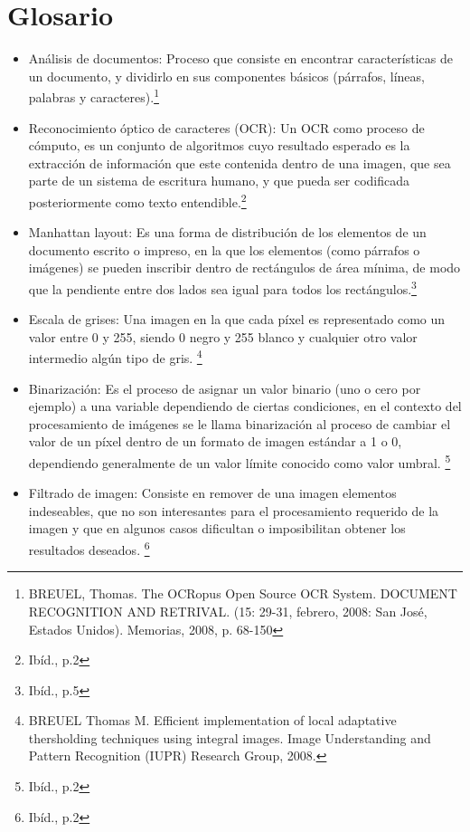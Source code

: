 \documentclass[a4paper, 11pt, oneside]{report}
\begin{document}
\chapter*{Glosario}
\begin{itemize}
    \item Análisis de documentos: Proceso que consiste en encontrar características de un documento,
    y dividirlo en sus componentes básicos (párrafos, líneas, palabras y caracteres).\footnote{BREUEL,
    Thomas. The OCRopus Open Source OCR System. DOCUMENT RECOGNITION AND RETRIVAL. (15: 29-31, febrero,
    2008: San José, Estados Unidos). Memorias, 2008, p. 68-150}
    \item Reconocimiento óptico de caracteres (OCR): Un OCR como proceso de cómputo, es un conjunto de
    algoritmos cuyo resultado esperado es la extracción de información  que este contenida dentro de
    una imagen, que sea parte de un sistema de escritura humano, y que pueda ser codificada
    posteriormente como texto entendible.\footnote{Ibíd., p.2}
    \item Manhattan layout: Es una forma de distribución de los elementos de un documento escrito o
    impreso, en la que los elementos (como párrafos o imágenes) se pueden inscribir
    dentro de rectángulos de área mínima, de modo que la pendiente entre dos lados sea igual para
    todos los rectángulos.\footnote{Ibíd., p.5}
    \item Escala de grises: Una imagen en la que cada píxel es representado como un valor entre 0 y
    255, siendo 0 negro y 255 blanco y cualquier otro valor intermedio algún tipo de gris. \footnote{
    BREUEL Thomas M. Efficient implementation of local adaptative thersholding techniques using integral 
    images. Image Understanding and Pattern Recognition (IUPR) Research Group, 2008.}
    \item Binarización:	Es el proceso de asignar un valor binario (uno o cero por ejemplo) a una
    variable dependiendo de	ciertas condiciones, en el contexto del procesamiento de imágenes se le
    llama binarización al proceso de cambiar el valor de un píxel dentro de un formato de imagen
    estándar a 1 o 0, dependiendo generalmente de un valor límite conocido como valor umbral.
    \footnote{Ibíd., p.2}
    \item Filtrado de imagen: Consiste en remover de una imagen elementos indeseables, que no
    son interesantes para el procesamiento requerido de la imagen y que en algunos casos dificultan
    o imposibilitan obtener los resultados deseados.
    \footnote{Ibíd., p.2}

\end{itemize}
\end{document}
